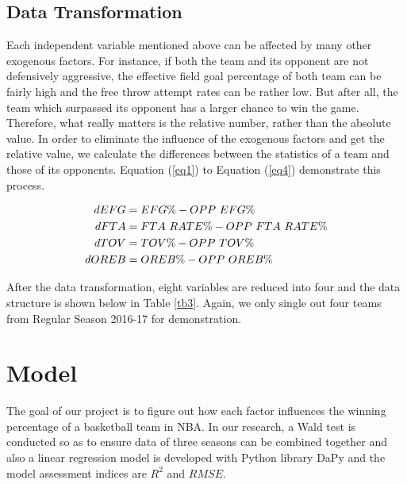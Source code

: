 \documentclass[12pt, a4paper]{article}
\begin{document}
\begin{spacing}{1.5}
\subsection{Data Transformation}
Each independent variable mentioned above can be affected by many other exogenous factors. For instance, if both the team and its opponent are not defensively aggressive, the effective field goal percentage of both team can be fairly high and the free throw attempt rates can be rather low. But after all, the team which surpassed its opponent has a larger chance to win the game. Therefore, what really matters is the relative number, rather than the absolute value. In order to eliminate the influence of the exogenous factors and get the relative value, we calculate the differences between the statistics of a team and those of its opponents. Equation (\ref{eq1}) to Equation (\ref{eq4}) demonstrate this process.
\begin{small}
\begin{align}
	\centering
	dEFG &= EFG\% - OPP\ EFG\% \label{eq1}\\
	dFTA &= FTA\ RATE\% - OPP\ FTA\ RATE\% \label{eq2}\\
	dTOV &= TOV\% - OPP\ TOV\% \label{eq3}\\
	dOREB &= OREB\% - OPP\ OREB\% \label{eq4}
\end{align}
\end{small}
\par
After the data transformation, eight variables are reduced into four and the data structure is shown below in Table \ref{tb3}. Again, we only single out four teams from Regular Season 2016-17 for demonstration.
\par
\begin{table}[!ht]
\centering
{}
\caption{The Difference of Four Factors from Regular Season 2016-2017}
\label{tb3}
\end{table}
\section{Model}
The goal of our project is to figure out how each factor influences the winning percentage of a basketball team in NBA. In our research, a Wald test is conducted so as to ensure data of three seasons can be combined together  and also a linear regression model is developed with Python library DaPy and the model assessment indices are  $R^2$ and $RMSE$.

\end{spacing}
\end{document}
